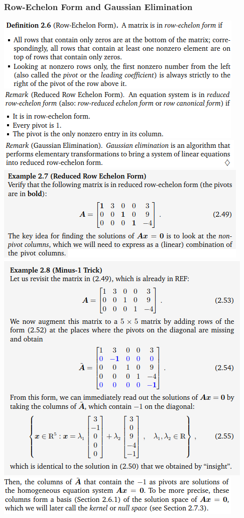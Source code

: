 \documentclass[oneside]{article}
\begin{document}
\begin{multicols}{2}
\subsubsection*{Row-Echelon Form and Gaussian Elimination}
\includegraphics[width=\linewidth]{2.3}
\includegraphics[width=\linewidth]{2.3_1}
\includegraphics[width=\linewidth]{2.3_2}
\includegraphics[width=\linewidth]{2.3_5}
\includegraphics[width=\linewidth]{2.3_3}
\includegraphics[width=\linewidth]{2.3_6}

\end{multicols}
\end{document}
